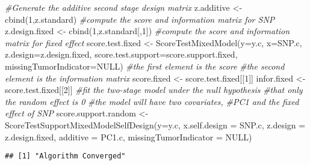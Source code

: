 \documentclass[11pt,]{article}
\newenvironment{Shaded}{\begin{snugshade}}{\end{snugshade}}
\newcommand{\AttributeTok}[1]{\textcolor[rgb]{0.77,0.63,0.00}{#1}}
\newcommand{\CommentTok}[1]{\textcolor[rgb]{0.56,0.35,0.01}{\textit{#1}}}
\newcommand{\ConstantTok}[1]{\textcolor[rgb]{0.00,0.00,0.00}{#1}}
\newcommand{\DecValTok}[1]{\textcolor[rgb]{0.00,0.00,0.81}{#1}}
\newcommand{\FunctionTok}[1]{\textcolor[rgb]{0.00,0.00,0.00}{#1}}
\newcommand{\NormalTok}[1]{#1}
\newcommand{\OtherTok}[1]{\textcolor[rgb]{0.56,0.35,0.01}{#1}}
\begin{document}
\begin{Shaded}
\begin{Highlighting}[]
\CommentTok{\#Generate the additive second stage design matrix}
\NormalTok{z.additive }\OtherTok{\textless{}{-}} \FunctionTok{cbind}\NormalTok{(}\DecValTok{1}\NormalTok{,z.standard)}
\CommentTok{\#compute the score and information matrix for SNP}
\NormalTok{z.design.fixed }\OtherTok{\textless{}{-}} \FunctionTok{cbind}\NormalTok{(}\DecValTok{1}\NormalTok{,z.standard[,}\DecValTok{1}\NormalTok{])}
\CommentTok{\#compute the score and information matrix for fixed effect}
\NormalTok{score.test.fixed }\OtherTok{\textless{}{-}} \FunctionTok{ScoreTestMixedModel}\NormalTok{(}\AttributeTok{y=}\NormalTok{y.c,}
                    \AttributeTok{x=}\NormalTok{SNP.c,}
                    \AttributeTok{z.design=}\NormalTok{z.design.fixed,}
                    \AttributeTok{score.test.support=}\NormalTok{score.support.fixed,}
                    \AttributeTok{missingTumorIndicator=}\ConstantTok{NULL}\NormalTok{)}
\CommentTok{\#the first element is the score}
\CommentTok{\#the second element is the information matrix}
\NormalTok{score.fixed }\OtherTok{\textless{}{-}}\NormalTok{ score.test.fixed[[}\DecValTok{1}\NormalTok{]]}
\NormalTok{infor.fixed }\OtherTok{\textless{}{-}}\NormalTok{ score.test.fixed[[}\DecValTok{2}\NormalTok{]]}
\CommentTok{\#fit the two{-}stage model under the null hypothesis}
\CommentTok{\#that only the random effect is 0}
\CommentTok{\#the model will have two covariates, }
\CommentTok{\#PC1 and the fixed effect of SNP}
\NormalTok{score.support.random }\OtherTok{\textless{}{-}} \FunctionTok{ScoreTestSupportMixedModelSelfDesign}\NormalTok{(}\AttributeTok{y=}\NormalTok{y.c,}
                        \AttributeTok{x.self.design  =}\NormalTok{ SNP.c,}
                        \AttributeTok{z.design =}\NormalTok{ z.design.fixed,}
                        \AttributeTok{additive =}\NormalTok{ PC1.c,}
                        \AttributeTok{missingTumorIndicator =} \ConstantTok{NULL}\NormalTok{)}
\end{Highlighting}
\end{Shaded}

\begin{verbatim}
## [1] "Algorithm Converged"
\end{verbatim}
\end{document}
